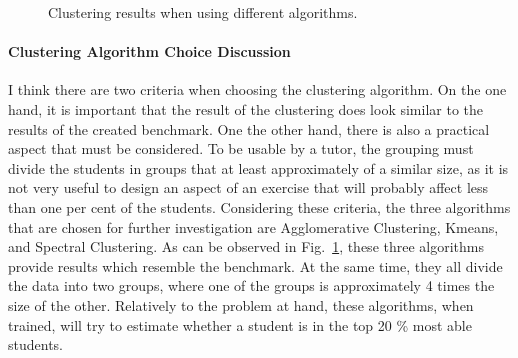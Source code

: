 \begin{figure}[h]
		\caption{Clustering results when using different algorithms.}
	\label{fig_comparison}		
\end{figure}

\paragraph{Clustering Algorithm Choice Discussion}
I think there are two criteria when choosing the clustering algorithm. On the one hand, it is important that the result of the clustering does look similar to the results of the created benchmark. One the other hand, there is also a practical aspect that must be considered. To be usable by a tutor, the grouping must divide the students in groups that at least approximately of a similar size, as it is not very useful to design an aspect of an exercise that will probably affect less than one per cent of the students. Considering these criteria, the three algorithms that are chosen for further investigation are Agglomerative Clustering, Kmeans, and Spectral Clustering. As can be observed in Fig.~\ref{fig_comparison}, these three algorithms provide results which resemble the benchmark. At the same time, they all divide the data into two groups, where one of the groups is approximately 4 times the size of the other. Relatively to the problem at hand, these algorithms, when trained, will try to estimate whether a student is in the top 20 \% most able students. 


